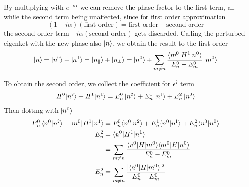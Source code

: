 \documentclass[../../../main.tex]{subfiles}
\begin{document}
By multiplying with $e ^{-i\alpha}$ we can remove the phase factor to the first term, all while the second term being unaffected, since for first order approximation
\begin{equation*}
    (1 - i\alpha)(\text{first order}) = \text{first order} + \text{second order}
\end{equation*}
the second order term $-i\alpha (\text{second order})$  gets  discarded.
Calling the perturbed eigenket with the new phase also $\ket{n }$, we obtain the result to the first order
\begin{equation*}
    \ket{n}
    = \ket{n ^{0 }} + \ket{n ^{1 } }
    = \ket{n _{\parallel}} +\ket{n _{\perp} }
    =\ket{n^0}+\sum_{m \neq n} \frac{ \braket{m^{0} | H^{1} | n^{0} }}{E^{0}_n - E^{0}_m}\ket{m^0}
\end{equation*}

To obtain the second order, we collect the coefficient for  $\epsilon^2$ term
\begin{equation*}
    H^0|n^2\rangle + H^1|n^1\rangle = E^0_n \ket{n^2} + E^1_n \ket{n^1} + E^2_n \ket{n^0}
\end{equation*}
Then dotting with $\ket{n ^{0}}$
\begin{align*}
    E^0_n \braket{n^0 |n^2 }+ \braket{n ^{0 } | H^1|n ^{1}} & =  E_n^{0} \langle n^{0} | n^{2} \rangle + E_n^{1} \langle n^{0} | n^{1} \rangle + E_n^{2} \langle n^{0} | n^{0} \rangle \\
    E_n^{2}                                                 & =      \braket{n ^{0 } | H^1|n ^{1}}                                                                                     \\
                                                            & = \sum_{m \neq n} \frac{\langle n^0 | H | m^0 \rangle \langle m^0 | H | n^0 \rangle}{E^0_n - E^0_m}                      \\
    E_n^{2}
                                                            & = \sum_{m \neq n} \frac{|\langle n^0 | H | m^0 \rangle|^2}{E^0_n - E^0_m}
\end{align*}
\end{document}

